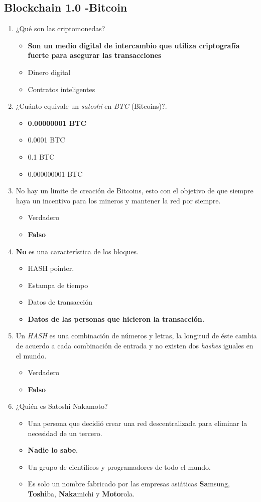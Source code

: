 \documentclass[a4paper,12pt]{lib/pub}
\begin{document}
\subsection{Blockchain 1.0 -Bitcoin}
\begin{enumerate}
	\item ¿Qué son las criptomonedas?
	\begin{itemize}
		\item \textbf{Son un medio digital de intercambio que utiliza criptografía fuerte para asegurar las transacciones}
		\item Dinero digital
		\item Contratos inteligentes
	\end{itemize}
	\item ¿Cuánto equivale un \textit{satoshi} en \textit{BTC} (Bitcoins)?.
	\begin{itemize}
		\item \textbf{0.00000001 BTC}
		\item 0.0001 BTC
		\item 0.1 BTC
		\item 0.000000001 BTC
	\end{itemize}
	\item No hay un limite de creación de Bitcoins, esto con el objetivo de que siempre haya un incentivo para los mineros y mantener la red por siempre.
	\begin{itemize}
		\item Verdadero
		\item \textbf{Falso}
	\end{itemize}
	\item \textbf{No} es una característica de los bloques.
	\begin{itemize}
		\item HASH pointer.
		\item Estampa de tiempo
		\item Datos de transacción
		\item \textbf{Datos de las personas que hicieron la transacción.}
	\end{itemize}
	\item Un \textit{HASH} es una combinación de números y letras, la longitud de éste cambia de acuerdo a cada combinación de entrada y no existen dos \textit{hashes} iguales en el mundo.
	\begin{itemize}
		\item Verdadero
		\item \textbf{Falso}
	\end{itemize}
	\item ¿Quién es Satoshi Nakamoto?
	\begin{itemize}
		\item Una persona que decidió crear una red descentralizada para eliminar la necesidad de un tercero.
		\item \textbf{Nadie lo sabe}.
		\item Un grupo de científicos y programadores de todo el mundo.
		\item Es solo un nombre fabricado por las empresas asiáticas \textbf{Sa}msung, \textbf{Toshi}ba, \textbf{Naka}michi y \textbf{Moto}rola.
	\end{itemize}
\end{enumerate}
\end{document}

